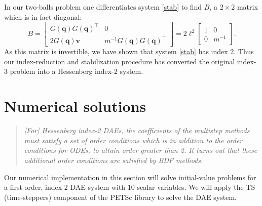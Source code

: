 \documentclass[letterpaper,final,12pt,reqno]{amsart}
\newcommand{\bq}{\mathbf{q}}
\newcommand{\bv}{\mathbf{v}}
\begin{document}
In our two-balls problem one differentiates system \eqref{stab} to find $B$, a $2\times 2$ matrix which is in fact diagonal:
\begin{equation}
B = \begin{bmatrix}  G(\bq) G(\bq)^\top & 0 \\ 2 G(\bq) \bv & m^{-1} G(\bq) G(\bq)^\top \end{bmatrix} = 2\ell^2 \begin{bmatrix}  1 & 0 \\ 0 & m^{-1} \end{bmatrix}.
\end{equation}
As this matrix is invertible, we have shown that system \eqref{stab} has index 2.  Thus our index-reduction and stabilization procedure has converted the original index-3 problem into a Hessenberg index-2 system.


\section{Numerical solutions}

\begin{quote}
\emph{[For] Hessenberg index-2 DAEs, the coefficients of the multistep methods must satisfy a set of order conditions which is in addition to the order conditions for ODEs, to attain order greater than 2.  It turns out that these additional order conditions are satisfied by BDF methods.} \, \cite[p 267]{AscherPetzold1998}
\end{quote}

Our numerical implementation in this section will solve initial-value problems for a first-order, index-2 DAE system with 10 scalar variables.  We will apply the TS (time-steppers) component of the PETSc library \cite{Balayetal2021,Bueler2021} to solve the DAE system.
\end{document}
